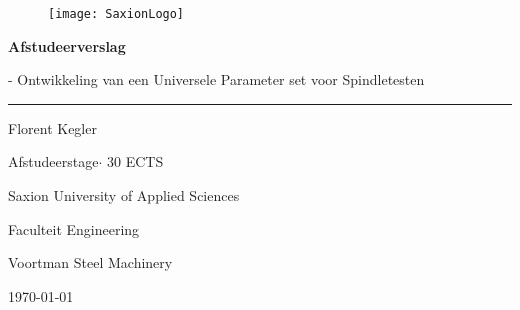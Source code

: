 \newcommand{\thesisAuthor}{Florent Kegler \newline 514277}
\newcommand{\thesisTitle}{Afstudeerverslag}
\newcommand{\thesisSubTitle}{Ontwikkeling van een Universele Parameter set voor Spindletesten}
\newcommand{\thesisDegree}{Afstudeerstage}
\newcommand{\university}{Saxion University of Applied Sciences}
\newcommand{\credits}{30 ECTS}
\newcommand{\faculty}{Faculteit Engineering}
\newcommand{\thesisPlaceDate}{\today}
\newcommand{\company}{Voortman Steel Machinery}

\begin{titlepage}
	
	\thispagestyle{empty}
	\myfont
	
	\begin{figure}
		\vspace{-3cm}
		\centering
		
		\begin{minipage}[t]{.7\linewidth}
			\vspace{1cm}
			\raggedleft
			\hspace*{1cm}\texttt{[image: SaxionLogo]}\hspace*{-4cm}
		\end{minipage}
	\end{figure}
	
	\vspace{3cm}
	\par
	\noindent
	\Huge
	\textbf{\thesisTitle}
	\vspace{0.2cm}
	\small
	\par
	\noindent
	- \thesisSubTitle\\
	\rule[0.3cm]{\linewidth}{2pt}
	\Large
	
	\noindent
	
	\vspace{4cm}
	\noindent
	\LARGE
	\thesisAuthor\\
	\vspace{4 cm}
	\small
	\par \noindent
	\thesisDegree $\cdot$ \credits
	\par \noindent
	\university
	\par \noindent
	\faculty
	\par \noindent
	\company
	\par \noindent
	\thesisPlaceDate
	



	
	
\end{titlepage}